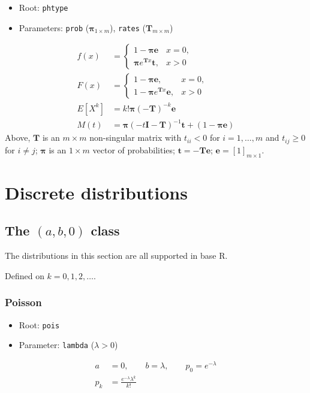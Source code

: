 \documentclass[x11names]{article}
\newcommand{\E}[1]{E[ #1 ]}
\newcommand{\mat}[1]{\bm{#1}}
\newcommand{\proglang}[1]{\textsf{#1}}
\newcommand{\code}[1]{\texttt{#1}}
\begin{document}
\begin{itemize}
\item Root: \code{phtype}
\item Parameters: \code{prob} ($\mat{\pi}_{1 \times m}$),
    \code{rates} ($\mat{T}_{m \times m}$)
\end{itemize}

\begin{align*}
  f(x)
  &=
    \begin{cases}
      1 - \mat{\pi} \mat{e} & x = 0, \\
      \mat{\pi} e^{\mat{T} x} \mat{t}, & x > 0
    \end{cases} \\
  F(x)
  &=
    \begin{cases}
      1 - \mat{\pi} \mat{e}, & x = 0, \\
      1 - \mat{\pi} e^{\mat{T} x} \mat{e}, & x > 0
    \end{cases} \\
  \E{X^k}
  &= k! \mat{\pi} (-\mat{T})^{-k} \mat{e} \\
  M(t)
  &= \mat{\pi} (-t \mat{I} - \mat{T})^{-1} \mat{t}
    + (1 - \mat{\pi} \mat{e})
\end{align*}
Above, $\mat{T}$ is an $m \times m$ non-singular matrix with
$t_{ii} < 0$ for $i = 1, \dots, m$ and $t_{ij} \geq 0$ for $i \neq j$;
$\mat{\pi}$ is an $1 \times m$ vector of probabilities;
$\mat{t} = -\mat{T} \mat{e}$; $\mat{e} = [1]_{m \times 1}$.


\section{Discrete distributions}
\label{sec:app:discrete}

\subsection[The (a, b, 0) class]{The $(a, b, 0)$ class}
\label{sec:app:discrete:a-b-0}

The distributions in this section are all supported in base
\proglang{R}.

Defined on $k = 0, 1, 2, \dots$.

\subsubsection{Poisson}

\begin{itemize}
\item Root: \code{pois}
\item Parameter: \code{lambda} ($\lambda > 0$)
\end{itemize}
\begin{align*}
  a &= 0, \qquad b = \lambda, \qquad p_0 = e^{-\lambda} \\
  p_k &= \frac{e^{-\lambda} \lambda^k}{k!}
\end{align*}
\end{document}
